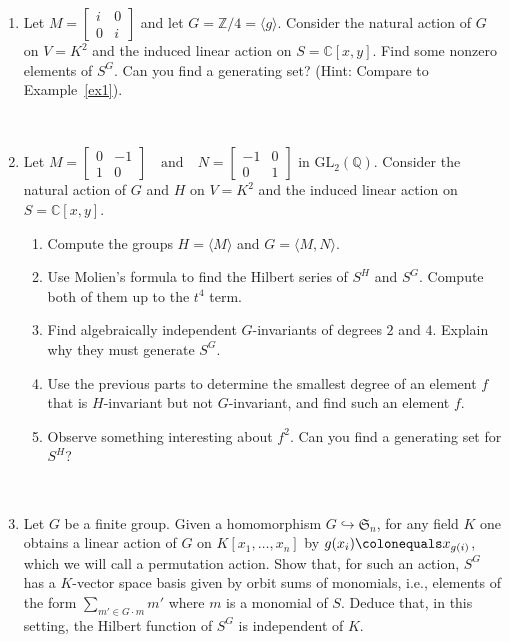 \documentclass[12pt]{amsart}
\theoremstyle{definition}
\numberwithin{equation}{theorem}
\def\CC{\mathbb{C}}
\def\QQ{\mathbb{Q}}
\def\ZZ{\mathbb{Z}}
\begin{document}
\begin{enumerate}
\item Let $M=\begin{bmatrix} i & 0 \\ 0 & i \end{bmatrix}$ and let $G=\ZZ/4 = \langle g \rangle$. Consider the natural action of $G$ on $V=K^2$ and the induced linear action on $S=\CC[x,y]$. Find some nonzero elements of $S^G$. Can you find a generating set? (Hint: Compare to Example~\ref{ex1}).

\


\item Let $M = \begin{bmatrix} 0 & -1 \\ 1 & 0 \end{bmatrix} \quad \text{and} \quad N= \begin{bmatrix} -1 & 0 \\ 0 & 1 \end{bmatrix}$
in $\mathrm{GL}_2(\QQ)$. Consider the natural action of $G$ and $H$ on $V=K^2$ and the induced linear action on $S=\CC[x,y]$.
\begin{enumerate}
\item Compute the groups $H= \langle M \rangle$ and $G= \langle M,N \rangle$. 
\item Use Molien's formula to find the Hilbert series of $S^H$ and $S^G$. Compute both of them up to the $t^4$ term.
\item Find algebraically independent $G$-invariants of degrees $2$ and $4$. Explain why they must generate $S^G$.
\item Use the previous parts to determine the smallest degree of an element $f$ that is $H$-invariant but not $G$-invariant, and find such an element $f$.
\item Observe something interesting about $f^2$. Can you find a generating set for $S^H$?
\end{enumerate}

\

\item Let $G$ be a finite group. Given a homomorphism $G \hookrightarrow \mathfrak{S}_n$, for any field $K$ one obtains a linear action of $G$ on $K[x_1,\dots,x_n]$ by $g(x_i) \colonequals x_{g(i)}$, which we will call a permutation action. Show that, for such an action, $S^G$ has a $K$-vector space basis given by orbit sums of monomials, i.e., elements of the form $\sum\limits_{m' \in G \cdot m} m'$ where $m$ is a monomial of $S$. Deduce that, in this setting, the Hilbert function of $S^G$ is independent of $K$.


\end{enumerate}
\end{document}
